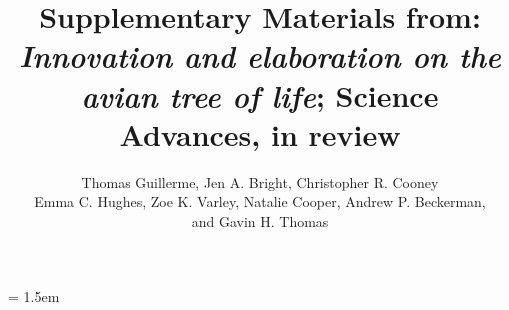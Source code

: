 \documentclass[12pt,a4paper]{article}
\title{Supplementary Materials from: \textit{Innovation and elaboration on the avian tree of life}; Science Advances, in review}
\author{Thomas Guillerme, 
Jen A. Bright,
Christopher R. Cooney\\
Emma C. Hughes,
Zoe K. Varley,
Natalie Cooper,
Andrew P. Beckerman,\\
and Gavin H. Thomas}
\date{}
\begin{document}
\maketitle

\tableofcontents

\parindent = 1.5em
\addtolength{\parskip}{.3em}


\newpage 

%
%


\end{document}
